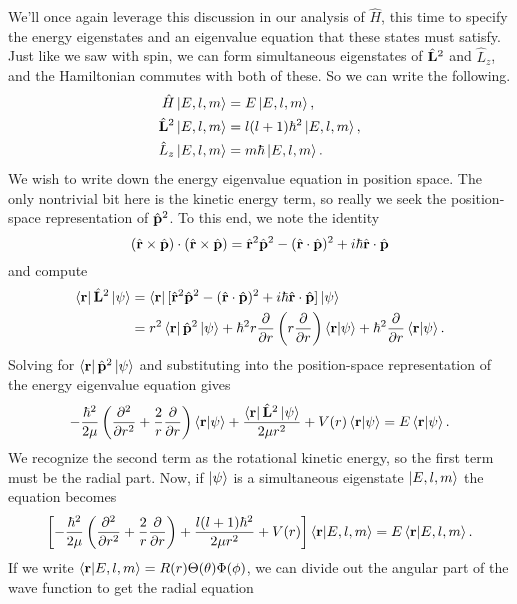 \documentclass[../p116main.tex]{subfiles}
\begin{document}
We'll once again leverage this discussion in our analysis of $\hat H$, this time to specify the energy eigenstates and an eigenvalue equation that these states must satisfy.
Just like we saw with spin, we can form simultaneous eigenstates of $\hat{\mathbf{L}}^2$ and $\hat L_z$, and the Hamiltonian commutes with both of these.
So we can write the following.
\begin{align*}
    \hat H \left| E, l, m \right> &= E \left| E, l, m \right>, \\
    \hat{\mathbf{L}}^2 \left| E, l, m \right> &= l(l+1) \hbar^2 \left| E, l, m \right>, \\
    \hat L_z \left| E, l, m \right> &= m\hbar \left| E, l, m \right>.
\end{align*}
We wish to write down the energy eigenvalue equation in position space.
The only nontrivial bit here is the kinetic energy term, so really we seek the position-space representation of $\hat{\mathbf{p}}^2$.
To this end, we note the identity
\[ (\hat{\mathbf{r}} \times \hat{\mathbf{p}}) \cdot (\hat{\mathbf{r}} \times \hat{\mathbf{p}}) = \hat{\mathbf{r}}^2 \hat{\mathbf{p}}^2 - (\hat{\mathbf{r}} \cdot \hat{\mathbf{p}})^2 + i\hbar \hat{\mathbf{r}} \cdot \hat{\mathbf{p}} \]
and compute
\begin{align*}
    \left< \mathbf{r} \right| \hat{\mathbf{L}}^2 \left| \psi \right> &= \left< \mathbf{r} \right| [\hat{\mathbf{r}}^2 \hat{\mathbf{p}}^2 - (\hat{\mathbf{r}} \cdot \hat{\mathbf{p}})^2 + i\hbar \hat{\mathbf{r}} \cdot \hat{\mathbf{p}}] \left| \psi \right> \\
    &= r^2 \left< \mathbf{r} \right| \hat{\mathbf{p}}^2 \left| \psi \right> + \hbar^2 r \frac{\partial}{\partial r} \left( r \frac{\partial}{\partial r} \right) \left< \mathbf{r} \middle| \psi \right> + \hbar^2 \frac{\partial}{\partial r} \left< \mathbf{r} \middle| \psi \right>.
\end{align*}
Solving for $\left< \mathbf{r} \right| \hat{\mathbf{p}}^2 \left| \psi \right>$ and substituting into the position-space representation of the energy eigenvalue equation gives
\[ -\frac{\hbar^2}{2\mu} \left( \frac{\partial^2}{\partial r^2} + \frac{2}{r} \frac{\partial}{\partial r} \right) \left< \mathbf{r} \middle| \psi \right> + \frac{\left< \mathbf{r} \right| \hat{\mathbf{L}}^2 \left| \psi \right>}{2\mu r^2} + V(r) \left< \mathbf{r} \middle| \psi \right> = E \left< \mathbf{r} \middle| \psi \right>. \]
We recognize the second term as the rotational kinetic energy, so the first term must be the radial part.
Now, if $\left| \psi \right>$ is a simultaneous eigenstate $\left| E,l,m \right>$ the equation becomes
\[ \left[ -\frac{\hbar^2}{2\mu} \left( \frac{\partial^2}{\partial r^2} + \frac{2}{r} \frac{\partial}{\partial r} \right) + \frac{l(l+1)\hbar^2}{2\mu r^2} + V(r) \right] \left< \mathbf{r} \middle| E,l,m \right> = E \left< \mathbf{r} \middle| E,l,m \right>. \]
If we write $\left< \mathbf{r} \middle| E,l,m \right> = R(r) \Theta(\theta) \Phi(\phi)$, we can divide out the angular part of the wave function to get the radial equation
\end{document}
